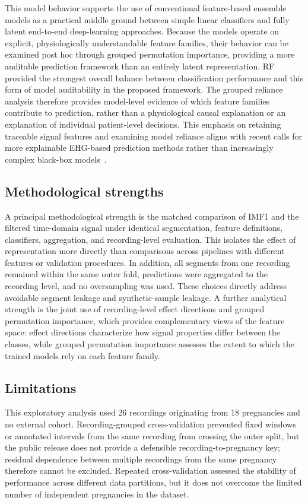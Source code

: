 \documentclass[10pt,letterpaper]{article}
\begin{document}
This model behavior supports the use of conventional feature-based ensemble models as a practical middle ground between simple linear classifiers and fully latent end-to-end deep-learning approaches. Because the models operate on explicit, physiologically understandable feature families, their behavior can be examined post hoc through grouped permutation importance, providing a more auditable prediction framework than an entirely latent representation. RF provided the strongest overall balance between classification performance and this form of model auditability in the proposed framework. The grouped reliance analysis therefore provides model-level evidence of which feature families contribute to prediction, rather than a physiological causal explanation or an explanation of individual patient-level decisions. This emphasis on retaining traceable signal features and examining model reliance aligns with recent calls for more explainable EHG-based prediction methods rather than increasingly complex black-box models~\cite{Pirnar2024,Goldsztejn2023_EHGDeepLearning,Fischer2023_EHGDeepLearning}.

\subsection*{Methodological strengths}
A principal methodological strength is the matched comparison of IMF1 and the filtered time-domain signal under identical segmentation, feature definitions, classifiers, aggregation, and recording-level evaluation. This isolates the effect of representation more directly than comparisons across pipelines with different features or validation procedures. In addition, all segments from one recording remained within the same outer fold, predictions were aggregated to the recording level, and no oversampling was used. These choices directly address avoidable segment leakage and synthetic-sample leakage. A further analytical strength is the joint use of recording-level effect directions and grouped permutation importance, which provides complementary views of the feature space: effect directions characterize how signal properties differ between the classes, while grouped permutation importance assesses the extent to which the trained models rely on each feature family. 
 
\subsection*{Limitations}

This exploratory analysis used 26 recordings originating from 18 pregnancies and no external cohort. Recording-grouped cross-validation prevented fixed windows or annotated intervals from the same recording from crossing the outer split, but the public release does not provide a defensible recording-to-pregnancy key; residual dependence between multiple recordings from the same pregnancy therefore cannot be excluded. Repeated cross-validation assessed the stability of performance across different data partitions, but it does not overcome the limited number of independent pregnancies in the dataset. 
\end{document}
